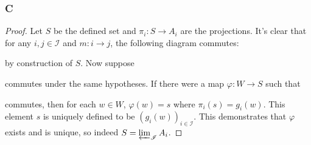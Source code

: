 \documentclass{article}
\newcommand{\fI}{\mathscr{I}}
\begin{document}
\subsubsection{C}\label{1.4.C}
\begin{proof}
    Let $S$ be the defined set and $\pi_i:S\to A_i$ are the projections. It's clear that for any $i,j\in \fI$ and $m:i\to j$, the following diagram commutes:
    \begin{center}
    \end{center}
    by construction of $S$. Now suppose
    \begin{center}
    \end{center}
    commutes under the same hypotheses. If there were a map $\varphi: W\to S$ such that
    \begin{center}
    \end{center}
    commutes, then for each $w\in W$, $\varphi(w)=s$ where $\pi_i(s)=g_i(w)$. This element $s$ is uniquely defined to be $(g_i(w))_{i\in \fI}$. This demonstrates that $\varphi$ exists and is unique, so indeed $S=\varprojlim_{\fI} A_i$.
\end{proof}
\end{document}

